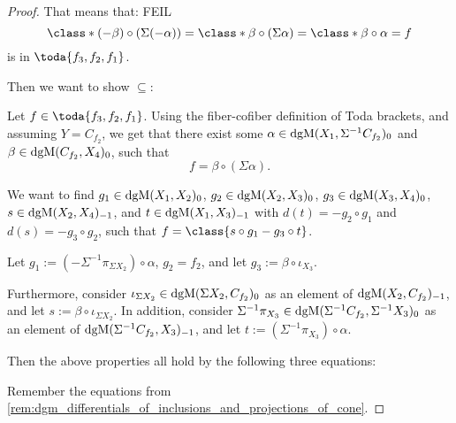 \begin{proof}
    That means that: FEIL
    \[
        \class*{(-\beta) \circ (\Sigma (- \alpha))} = \class*{\beta \circ (\Sigma \alpha)} = \class*{\beta \circ \alpha} = f
    \]
    is in \( \toda{f_3, f_2, f_1} \).

    Then we want to show \( \subseteq \):

    Let \( f \in \toda{f_3, f_2, f_1} \). Using the fiber-cofiber definition of Toda brackets, and assuming \( Y = C_{f_2} \), we get that there exist some \( \alpha \in \operatorname{dgM}(X_1, \Sigma^{-1} C_{f_2})_0 \) and \( \beta \in \operatorname{dgM}(C_{f_2}, X_4)_0 \), such that
    \[
        f = \beta \circ (\Sigma \alpha).
    \]

    We want to find \( g_1 \in \operatorname{dgM}(X_1, X_2)_0 \), \( g_2 \in \operatorname{dgM}(X_2, X_3)_0 \), \( g_3 \in \operatorname{dgM}(X_3, X_4)_0 \), \( s \in \operatorname{dgM}(X_2, X_4)_{-1} \), and \( t \in \operatorname{dgM}(X_1, X_3)_{-1} \) with \( d(t) = - g_2 \circ g_1 \) and \( d(s) = -g_3 \circ g_2 \), such that \( f = \class{s \circ g_1 - g_3 \circ t} \).

    Let \( g_1 := (-\Sigma^{-1} \pi_{\Sigma X_2}) \circ \alpha \), \( g_2 = f_2 \), and let \( g_3 := \beta \circ \iota_{X_3} \). 

    Furthermore, consider \( \iota_{\Sigma X_2} \in \operatorname{dgM}(\Sigma X_2, C_{f_2})_0 \) as an element of \( \operatorname{dgM}(X_2, C_{f_2})_{-1} \), and let \( s := \beta \circ \iota_{\Sigma X_2} \). In addition, consider \( \Sigma^{-1} \pi_{X_3} \in \operatorname{dgM}(\Sigma^{-1} C_{f_2}, \Sigma^{-1} X_3)_0 \) as an element of \( \operatorname{dgM}(\Sigma^{-1} C_{f_2}, X_3)_{-1} \), and let \( t := (\Sigma^{-1} \pi_{X_3}) \circ \alpha \).

    Then the above properties all hold by the following three equations:

    Remember the equations from \autoref{rem:dgm_differentials_of_inclusions_and_projections_of_cone}.


\end{proof}

